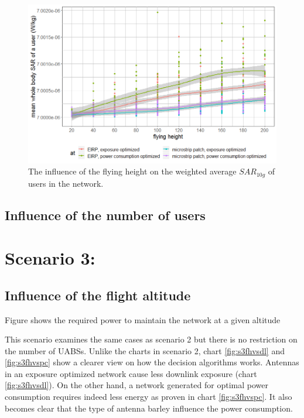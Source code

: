 \begin{figure}[h!]
  \includegraphics[width=\textwidth]{../results/s2/fhvssar.png}
  \caption{The influence of the flying height on the weighted average $SAR_{10g}$ of users in the network.}
  \label{fig:s2fhvssar}
\end{figure}


\subsection{Influence of the number of users}


\section{Scenario 3:}
\subsection{Influence of the flight altitude}
Figure shows the required power to maintain the network at a given altitude


This scenario examines the same cases as scenario 2 but there is no restriction on the number of \gls{UABS}s. 
Unlike the charts in scenario 2, chart \ref{fig:s3fhvsdl} and \ref{fig:s3fhvspc} show a clearer view on how the decision algorithms
 works. Antennas in an exposure optimized network cause less downlink exposure (chart \ref{fig:s3fhvsdl}). On the other hand, 
 a network generated for optimal power consumption requires indeed less energy as proven in chart \ref{fig:s3fhvspc}. 
 It also becomes clear that the type of antenna barley influence the power consumption.

